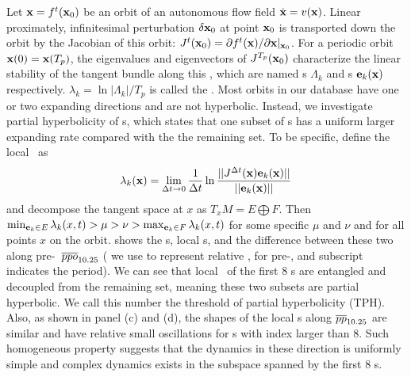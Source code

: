 \documentclass[prl,aps,preprint,showpacs]{revtex4-1} %
\begin{document}
Let $\op = f^t(\op_0)$ be an orbit of an autonomous flow field
$\dot{\op} = v(\op)$. Linear proximately, infinitesimal
perturbation $\delta \op_0$ at point $\op_0$ is transported down the
orbit by the Jacobian of this orbit:
$J^t(\op_0) = \partial f^t(\op) / \partial \op |_{\op_0}$.
For a periodic orbit $\op(0) = \op (T_p)$, the
eigenvalues and eigenvectors of $J^{T_p}(\op_0)$ characterize the
linear stability of the tangent bundle along this \po, which
are named \Fm s $\Lambda_k$ and \Fv s $\jEigvec[k](\op)$ respectively.
$\lambda_k = \ln|\Lambda_k|/T_p$ is called the \Fe.
Most orbits in our database have one or two expanding
directions and are not hyperbolic. Instead, we investigate
partial hyperbolicity of \po s, which states that one subset of
\Fv s has a uniform larger expanding rate compared with the the
remaining set. To be specific, define the local \Fe\ as
\begin{equation}
  \label{eq:1}
  \lambda_k(\op) = \lim_{\Delta t \to 0}
  \frac{1}{\Delta t}
  \ln
  \frac{||J^{\Delta t}(\op)\jEigvec[k](\op)||}
  {||\jEigvec[k](\op)||}
\end{equation}
and decompose the tangent space at $x$ as $T_xM=E \bigoplus F$. Then
$\min_{\jEigvec[k]\in E} \lambda_k(x,t)
 > \mu > \nu > \max_{\jEigvec[k]\in F} \lambda_k(x,t)$ for some
specific $\mu$ and $\nu$ and for all points $x$ on the orbit.
shows the \Fe s, local \Fe s, and the difference between these two
along pre-\po\ $\cycle{ppo}_{10.25}$
( we use  to represent relative \po,
 for pre-\po, and subscript indicates the period).
We can see that local \Fe\ of
the first 8 \Fv s are entangled and decoupled from the remaining
set, meaning these two subsets are partial hyperbolic.
We call this number the threshold of partial hyperbolicity (TPH).
Also, as shown
in panel (c) and (d), the shapes of the local \Fe s along
$\cycle{pp}_{10.25}$ are similar and have relative small oscillations
for \Fv s with index larger than 8. Such homogeneous property suggests
that the dynamics in these direction is uniformly
simple and complex dynamics
exists in the subspace spanned by the first 8 \Fv s.
\end{document}
